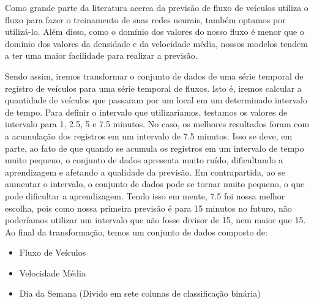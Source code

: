 Como grande parte da literatura acerca da previsão de fluxo de veículos utiliza o fluxo para fazer o treinamento de suas redes neurais, também optamos por utilizá-lo. Além disso, como o domínio dos valores do nosso fluxo é menor que o domínio dos valores da densidade e da velocidade média, nossos modelos tendem a ter uma maior facilidade para realizar a previsão.

Sendo assim, iremos transformar o conjunto de dados de uma série temporal de registro de veículos para uma série temporal de fluxos. Isto é, iremos calcular a quantidade de veículos que passaram por um local em um determinado intervalo de tempo. Para definir o intervalo que utilizaríamos, testamos os valores de intervalo para 1, 2.5, 5 e 7.5 minutos. No caso, os melhores resultados foram com a acumulação dos registros em um intervalo de 7.5 minutos. Isso se deve, em parte, ao fato de que quando se acumula os registros em um intervalo de tempo muito pequeno, o conjunto de dados apresenta muito ruído, dificultando a aprendizagem e afetando a qualidade da previsão. Em contrapartida, ao se aumentar o intervalo, o conjunto de dados pode se tornar muito pequeno, o que pode dificultar a aprendizagem. Tendo isso em mente, 7.5 foi nossa melhor escolha, pois como nossa primeira previsão é para 15 minutos no futuro, não poderíamos utilizar um intervalo que não fosse divisor de 15, nem maior que 15. Ao final da transformação, temos um conjunto de dados composto de:

\begin{itemize}
    \item Fluxo de Veículos
    \item Velocidade Média
    \item Dia da Semana (Divido em sete colunas de classificação binária)
\end{itemize}

